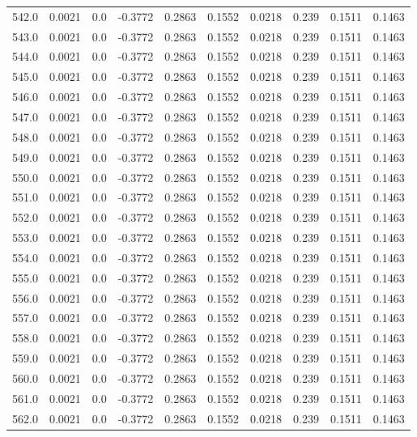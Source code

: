 \begin{longtable}{lrrrrrrrrr}
542.0 & 0.0021 & 0.0 & -0.3772 & 0.2863 & 0.1552 & 0.0218 & 0.239 & 0.1511 & 0.1463 \\
543.0 & 0.0021 & 0.0 & -0.3772 & 0.2863 & 0.1552 & 0.0218 & 0.239 & 0.1511 & 0.1463 \\
544.0 & 0.0021 & 0.0 & -0.3772 & 0.2863 & 0.1552 & 0.0218 & 0.239 & 0.1511 & 0.1463 \\
545.0 & 0.0021 & 0.0 & -0.3772 & 0.2863 & 0.1552 & 0.0218 & 0.239 & 0.1511 & 0.1463 \\
546.0 & 0.0021 & 0.0 & -0.3772 & 0.2863 & 0.1552 & 0.0218 & 0.239 & 0.1511 & 0.1463 \\
547.0 & 0.0021 & 0.0 & -0.3772 & 0.2863 & 0.1552 & 0.0218 & 0.239 & 0.1511 & 0.1463 \\
548.0 & 0.0021 & 0.0 & -0.3772 & 0.2863 & 0.1552 & 0.0218 & 0.239 & 0.1511 & 0.1463 \\
549.0 & 0.0021 & 0.0 & -0.3772 & 0.2863 & 0.1552 & 0.0218 & 0.239 & 0.1511 & 0.1463 \\
550.0 & 0.0021 & 0.0 & -0.3772 & 0.2863 & 0.1552 & 0.0218 & 0.239 & 0.1511 & 0.1463 \\
551.0 & 0.0021 & 0.0 & -0.3772 & 0.2863 & 0.1552 & 0.0218 & 0.239 & 0.1511 & 0.1463 \\
552.0 & 0.0021 & 0.0 & -0.3772 & 0.2863 & 0.1552 & 0.0218 & 0.239 & 0.1511 & 0.1463 \\
553.0 & 0.0021 & 0.0 & -0.3772 & 0.2863 & 0.1552 & 0.0218 & 0.239 & 0.1511 & 0.1463 \\
554.0 & 0.0021 & 0.0 & -0.3772 & 0.2863 & 0.1552 & 0.0218 & 0.239 & 0.1511 & 0.1463 \\
555.0 & 0.0021 & 0.0 & -0.3772 & 0.2863 & 0.1552 & 0.0218 & 0.239 & 0.1511 & 0.1463 \\
556.0 & 0.0021 & 0.0 & -0.3772 & 0.2863 & 0.1552 & 0.0218 & 0.239 & 0.1511 & 0.1463 \\
557.0 & 0.0021 & 0.0 & -0.3772 & 0.2863 & 0.1552 & 0.0218 & 0.239 & 0.1511 & 0.1463 \\
558.0 & 0.0021 & 0.0 & -0.3772 & 0.2863 & 0.1552 & 0.0218 & 0.239 & 0.1511 & 0.1463 \\
559.0 & 0.0021 & 0.0 & -0.3772 & 0.2863 & 0.1552 & 0.0218 & 0.239 & 0.1511 & 0.1463 \\
560.0 & 0.0021 & 0.0 & -0.3772 & 0.2863 & 0.1552 & 0.0218 & 0.239 & 0.1511 & 0.1463 \\
561.0 & 0.0021 & 0.0 & -0.3772 & 0.2863 & 0.1552 & 0.0218 & 0.239 & 0.1511 & 0.1463 \\
562.0 & 0.0021 & 0.0 & -0.3772 & 0.2863 & 0.1552 & 0.0218 & 0.239 & 0.1511 & 0.1463 \\

\end{longtable}
